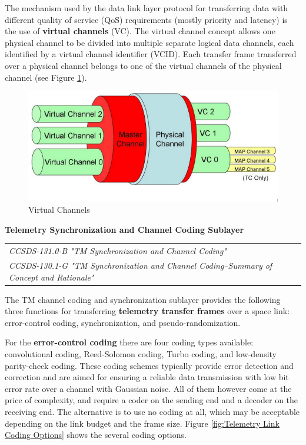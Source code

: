 The mechanism used by the data link layer protocol for transferring data with different quality of service (QoS) requirements (mostly priority and latency) is the use of \textbf{virtual channels} (VC). The virtual channel concept allows one physical channel to be divided into multiple separate logical data channels, each identified by a virtual channel identifier (VCID). Each transfer frame transferred over a physical channel belongs to one of the virtual channels of the physical channel (see Figure \ref{fig:Virtual Channels}).

\begin{figure}[h]
\centering\includegraphics[scale=0.4]{fig/virtual_channels}
\caption{Virtual Channels}
\label{fig:Virtual Channels}
\end{figure}

\textbf{Telemetry Synchronization and Channel Coding Sublayer}

\begin{tabular}{l}
\textit{CCSDS-131.0-B "TM Synchronization and Channel Coding" \cite{CCSDS-131.0-B}} \\
\textit{CCSDS-130.1-G "TM Synchronization and Channel Coding--Summary of Concept and Rationale" \cite{CCSDS-130.1-G}}
\end{tabular}

The TM channel coding and synchronization sublayer provides the following three functions for transferring \textbf{telemetry transfer frames} over a space link: error-control coding, synchronization, and pseudo-randomization. 

For the \textbf{error-control coding} there are four coding types available: convolutional coding, Reed-Solomon coding, Turbo coding, and low-density parity-check coding. These coding schemes typically provide error detection and correction and are aimed for ensuring a reliable data transmission with low bit error rate over a channel with Gaussian noise. All of them however come at the price of complexity, and require a coder on the sending end and a decoder on the receiving end. The alternative is to use no coding at all, which may be acceptable depending on the link budget and the frame size. Figure \ref{fig:Telemetry Link Coding Options} shows the several coding options.

